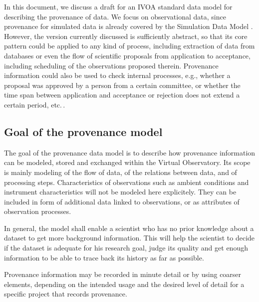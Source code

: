 In this document, we discuss a draft for an IVOA standard data model for
describing the provenance of data. We focus on observational data, since
provenance for simulated data is already covered by the Simulation Data Model
\citep[SimDM][]{std:SimDM}. However, the version currently discussed is
sufficiently abstract, so that its core pattern could be applied to any kind
of process, including extraction of data from 
databases or even the flow of scientific proposals from application to 
acceptance, including scheduling of the observations proposed therein.
Provenance information could also be used to check internal processes,
e.g., whether a proposal was approved by a person from a certain committee,
or whether the time span between application and acceptance or rejection
does not extend a certain period, etc.\,. 


\subsection{Goal of the provenance model}\label{sec:goals}
The goal of the provenance data model is to describe how provenance information
can be modeled, stored and exchanged within the Virtual Observatory. Its scope
is mainly modeling of the flow of data, of the relations between data,
and of processing steps. Characteristics of observations such as ambient
conditions and instrument characteristics will not be modeled here
explicitely. They can be included in form of additional data linked to
observations, or as attributes of observation processes.

In general, the model shall enable a scientist who has no prior knowledge about
a dataset to get more 
background information. This will help the scientist to decide if the dataset 
is adequate for his research goal, judge its quality and get enough information
to be able to trace back its history as far as possible. 

Provenance information may be recorded in minute detail or by using coarser
elements, depending on the intended usage and the desired level of detail
for a specific project that records provenance.

